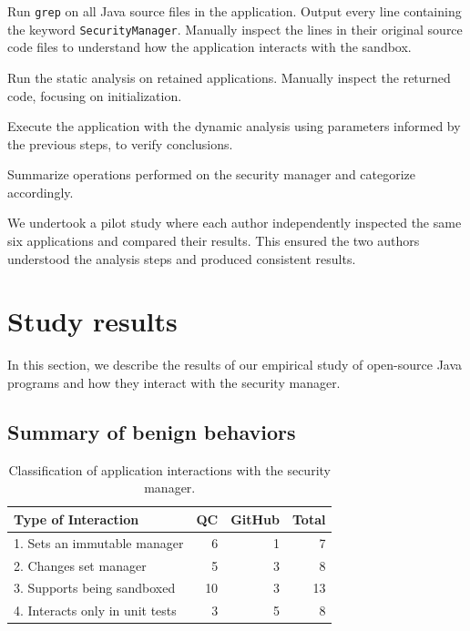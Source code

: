 \documentclass{sig-alternate}
\begin{document}
\begin{flushenum}\setlength{\parskip}{0pt}
  \setlength{\parsep}{0pt}
  \setlength{\itemsep}{0pt}
\item Run \texttt{grep} on all Java source files in the application.
Output every line containing the keyword \texttt{SecurityManager}.
Manually inspect the lines in their original source code files to understand
how the application interacts with the sandbox.
\item Run the static analysis on retained applications. Manually inspect the
  returned code, focusing on initialization. 
\item Execute the application with the dynamic analysis using parameters
  informed by the previous steps, 
to verify conclusions.
\item Summarize operations performed
on the security manager and categorize accordingly.
\end{flushenum}

We undertook a pilot study where each author
independently inspected the same six applications and compared their
results. This ensured the two authors understood the analysis steps 
and produced consistent results.


\section{Study results}\label{sec:Study-results}

In this section, we describe the results of our empirical study of open-source
Java programs and how they interact with the security manager. 

\subsection{Summary of benign behaviors}\label{sub:Evaluation-of-the-hypotheses}


\begin{table}
\caption{Classification of application
  interactions \label{tab:Classification-of-Application}
with the security manager.}
\begin{tabular}{lrrr}
\toprule 
Type of Interaction & QC & GitHub & Total\tabularnewline
\midrule
1. Sets an immutable manager & 6 & 1 & 7\tabularnewline
2. Changes set manager & 5 & 3 & 8\tabularnewline
3. Supports being sandboxed & 10 & 3 & 13\tabularnewline
4. Interacts only in unit tests & 3 & 5 & 8\tabularnewline
\bottomrule
\end{tabular}
\end{table}
\end{document}
